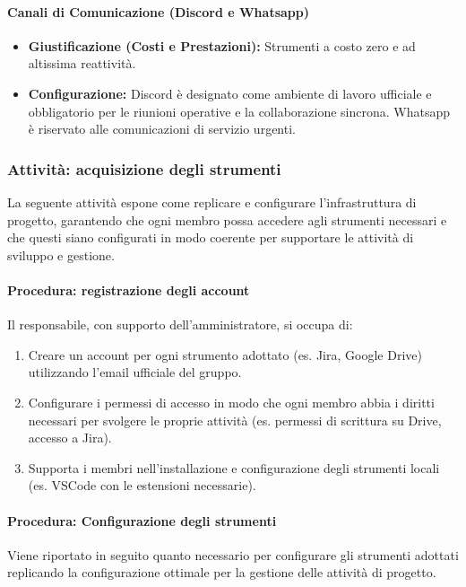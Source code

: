 \documentclass[a4paper,12pt]{article}
\begin{document}
\paragraph{Canali di Comunicazione (Discord e Whatsapp)}
\begin{itemize}
    \item \textbf{Giustificazione (Costi e Prestazioni):} Strumenti a costo zero e ad altissima reattività.
    \item \textbf{Configurazione:} Discord è designato come ambiente di lavoro ufficiale e obbligatorio per le riunioni operative e la collaborazione sincrona. Whatsapp è riservato alle comunicazioni di servizio urgenti.
\end{itemize}

\subsubsection{Attività: acquisizione degli strumenti}\label{creazioneInfrastruttura}
La seguente attività espone come replicare e configurare l'infrastruttura di progetto, garantendo che ogni membro possa accedere agli strumenti necessari e che questi siano configurati in modo coerente per supportare le attività di sviluppo e gestione.
\paragraph{Procedura: registrazione degli account}
Il responsabile, con supporto dell'amministratore, si occupa di:
\begin{enumerate}
    \item Creare un account per ogni strumento adottato (es. Jira, Google Drive) utilizzando l'email ufficiale del gruppo.
    \item Configurare i permessi di accesso in modo che ogni membro abbia i diritti necessari per svolgere le proprie attività (es. permessi di scrittura su Drive, accesso a Jira).
    \item Supporta i membri nell'installazione e configurazione degli strumenti locali (es. VSCode con le estensioni necessarie).
\end{enumerate}

\paragraph{Procedura: Configurazione degli strumenti}
Viene riportato in seguito quanto necessario per configurare gli strumenti adottati replicando la configurazione ottimale per la gestione delle attività di progetto.
\end{document}
